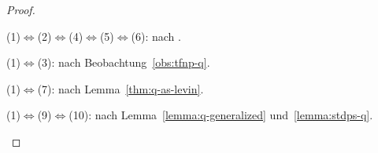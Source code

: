 \begin{proof}
\begin{prooflist}
\item (1)$\iff$(2)$\iff$(4)$\iff$(5)$\iff$(6): nach \textcite[Thm.~2]{fenner_inverting_2003}. 

\item (1)$\iff$(3): nach Beobachtung~\ref{obs:tfnp-q}.

\item (1)$\iff$(7): nach Lemma~\ref{thm:q-as-levin}.

\item (1)$\iff$(9)$\iff$(10): nach Lemma~\ref{lemma:q-generalized} und~\ref{lemma:stdps-q}.






\end{prooflist}
\end{proof}
